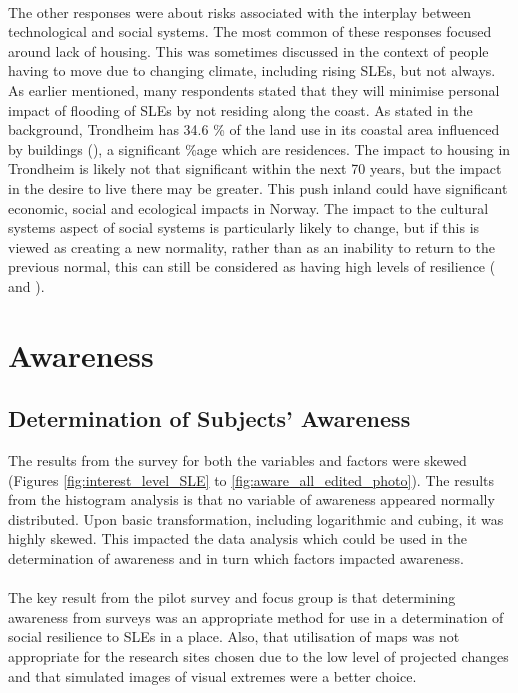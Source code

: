 \paragraph{}
The other responses were about risks associated with the interplay between technological and social systems. The most common of these responses focused around lack of housing. This was sometimes discussed in the context of people having to move due to changing climate, including rising SLEs, but not always.  As earlier mentioned, many respondents stated that they will minimise personal impact of flooding of SLEs by not residing along the coast.  As stated in the background, Trondheim has 34.6 \% of the land use in its coastal area influenced by buildings (\cite{engebakken_construction_2022}), a significant \%age which are residences. The impact to housing in Trondheim is likely not that significant within the next 70 years, but the impact in the desire to live there may be greater. This push inland could have significant economic, social and ecological impacts in Norway. The impact to the cultural systems aspect of social systems is particularly likely to change, but if this is viewed as creating a new normality, rather than as an inability to return to the previous normal, this can still be considered as having high levels of resilience (\cite{cutter_place-based_2008} and \cite{cutter_community_2020}).
\paragraph{}




\section{Awareness}

\subsection{Determination of Subjects' Awareness}
The results from the survey for both the variables and factors were skewed (Figures \ref{fig:interest_level_SLE} to \ref{fig:aware_all_edited_photo}). The results from the histogram analysis is that no variable of awareness appeared normally distributed. Upon basic transformation, including logarithmic and cubing, it was highly skewed. This impacted the data analysis which could be used in the determination of awareness and in turn which factors impacted awareness. 

\paragraph{}
The key result from the pilot survey and focus group is that determining awareness from surveys was an appropriate method for use in a determination of social resilience to SLEs in a place. Also, that utilisation of maps was not appropriate for the research sites chosen due to the low level of projected changes and that simulated images of visual extremes were a better choice.
